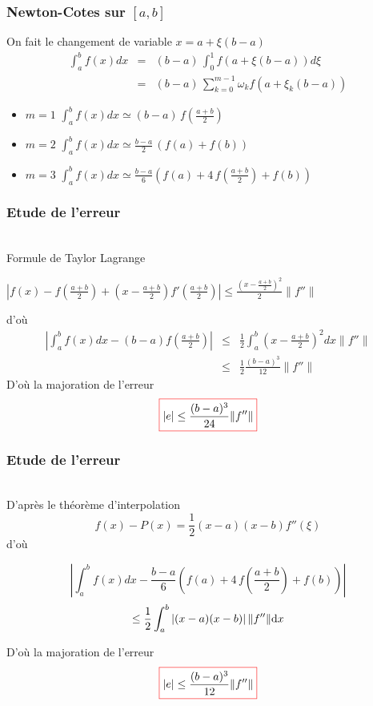\documentclass{beamer}
\def \de {{\rm d}}
\newcommand{\myredbox}[1]{\fcolorbox{red}{white}{$\displaystyle#1$}}
\begin{document}
\begin{frame}
 \frametitle{Newton-Cotes sur $\left[a,b\right]$}
 On fait le changement de variable $x=a+\xi (b-a)$
 \[\begin{array}{ccl}
 \displaystyle \int_a^b f(x)dx &=& (b-a)\,\displaystyle \int_0^1 f(a+\xi (b-a))d\xi\\
                 &=&(b-a)\,\displaystyle{\sum_{k=0}^{m-1}\omega_k f(a+\xi_k (b-a))}
 \end{array}
 \]
\begin{itemize}
\item $m=1$ $\boxed{\int_a^b f(x)dx \simeq (b-a)\, f\left(\frac {a+b}2\right)}$
\item $m=2$ $\boxed{\int_a^b f(x)dx \simeq \frac{b-a}2\, \left(f\left(a\right)+f\left(b\right)\right)}$
\item $m=3$ $\boxed{\int_a^b f(x)dx \simeq \frac{b-a}6 \left(f\left(a \right) +4\, f\left(\frac{a+b}2\right)+ f\left(b \right)\right)}$
\end{itemize}

\end{frame}

\begin{frame}
 \frametitle{Etude de l'erreur}
 \\ Formule de Taylor Lagrange
\begin{center}
$\left|f(x)-f(\frac {a+b}2)+(x-\frac {a+b}2)f'(\frac {a+b}2)\right|\leq \frac{\left(x-\frac {a+b}2\right)^2}2\|f''\|$ 
\end{center}

d'où
\[\begin{array}{ccl}
\left|\int_a^bf(x)dx-(b-a)f(\frac {a+b}2)\right|&\leq &\frac 12 \int_a^b\left(x-\frac {a+b}2\right)^2dx \|f''\|\\
&\leq &\frac 12 \frac{(b-a)^3}{12}\|f''\|
\end{array}\]
D'où la majoration de l'erreur
\[\myredbox{|e|\leq \frac{(b-a)^3}{24}\|f''\|}\]




\end{frame}

\begin{frame}
 \frametitle{Etude de l'erreur}
 \\ D'après le théorème d'interpolation
\[f(x)-P(x) = \frac 12 (x-a)(x-b)f''(\xi)\]
d'où

\[\left|\int_a^bf(x)dx-\frac{b-a}6 \left(f\left(a \right) +4\, f\left(\frac{a+b}2\right)+ f\left(b \right)\right)\right|\]
\[\leq \frac 12\int_a^b\left| (x-a)(x-b)\right| \|f''\|\de x\]

D'où la majoration de l'erreur
\[\myredbox{|e|\leq \frac{(b-a)^3}{12}\|f''\|}\]




\end{frame}
\end{document}
